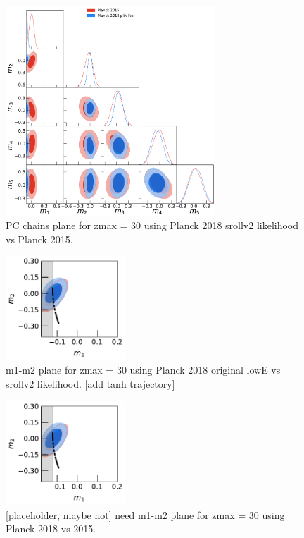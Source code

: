 \documentclass[prd,twocolumn,amsmath,amssymb,floatfix,superscriptaddress,nofootinbib]{revtex4-1}
\begin{document}
\begin{widetext}

\begin{figure}
\includegraphics[width=0.7\textwidth]{results/pc_results/plot_mj_triangle_t18_r12_t19_t20_vs_pl18_pc_zmax30_pliklite.pdf}
\caption{PC chains plane for zmax = 30 using Planck 2018 srollv2 likelihood vs Planck 2015.
}
\label{fig:plot_mjs_2018_vs_2015}
\end{figure}

\end{widetext}

\begin{figure}
\includegraphics[width=0.4\textwidth]{results/pc_results/plot_m1_m2_pl18_pc_zmax30_pliklite_srollv2_vs_pl18_pc_zmax30_pliklite_wTauTrajectory.pdf}
\caption{m1-m2 plane for zmax = 30 using Planck 2018 original lowE vs srollv2 likelihood. [add tanh trajectory]
}
\label{fig:plot_m1m2}
\end{figure}

\begin{figure}
\includegraphics[width=0.4\textwidth]{results/pc_results/plot_m1_m2_pl18_pc_zmax30_pliklite_srollv2_vs_pl18_pc_zmax30_pliklite_wTauTrajectory.pdf}
\caption{[placeholder, maybe not] need m1-m2 plane for zmax = 30 using Planck 2018 vs 2015.
}
\label{fig:plot_m1m2}
\end{figure}
\end{document}
